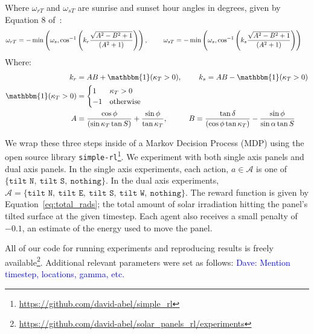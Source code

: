 \documentclass[11pt]{article}
\newcommand{\dnote}[1]{\textcolor{blue}{Dave: #1}}
\newcommand{\mc}{\mathcal}
\begin{document}
\begin{enumerate}
Where $\omega_{rT}$ and $\omega_{sT}$ are sunrise and sunset hour angles in degrees, given by Equation 8 of~\citet{kamali2006estimating}:
\begin{align*}
\omega_{rT} &= - \min\left(\omega_s, \cos^{-1} \left( k_r  \frac{\sqrt{A^2 - B^2 + 1}}{(A^2 + 1)}\right)\right), \hspace{8mm} \omega_{sT} = - \min\left(\omega_s, \cos^{-1} \left( k_s \frac{\sqrt{A^2 - B^2 + 1}}{(A^2 + 1)}\right)\right)
\end{align*}
Where:
\begin{align*}
k_r &= AB + \mathbbm{1}(\kappa_T > 0), \hspace{8mm} k_s = AB - \mathbbm{1}(\kappa_T > 0) \\
\mathbbm{1}(\kappa_T > 0) &= \begin{cases}
1& \kappa_T > 0 \\
-1& \text{otherwise}
\end{cases} \\
A &= \frac{\cos \phi}{(\sin \kappa_T \tan S)} + \frac{\sin \phi}{\tan \kappa_T}, \hspace{10mm} B= \frac{\tan \delta}{(\cos \phi \tan \kappa_T)} - \frac{\sin \phi}{\sin \alpha \tan S}
\end{align*}

\end{enumerate}

We wrap these three steps inside of a Markov Decision Process (MDP) using the open source library \texttt{simple-rl}\footnote{\url{https://github.com/david-abel/simple_rl}}. We experiment with both single axis panels and dual axis panels. In the single axis experiments, each action, $a \in \mc{A}$ is one of $\{\texttt{tilt N},\ \texttt{tilt S},\ \texttt{nothing}\}$. In the dual axis experiments, $\mc{A} = \{\texttt{tilt N},\ \texttt{tilt E},\ \texttt{tilt S},\ \texttt{tilt W},\ \texttt{nothing}\}$. The reward function is given by Equation~\ref{eq:total_rads}; the total amount of solar irradiation hitting the panel's tilted surface at the given timestep. Each agent also receives a small penalty of $-0.1$, an estimate of the energy used to move the panel.

All of our code for running experiments and reproducing results is freely available\footnote{\url{https://github.com/david-abel/solar_panels_rl/experiments}}. Additional relevant parameters were set as follows: \dnote{Mention timestep, locations, gamma, etc.}
\end{document}
